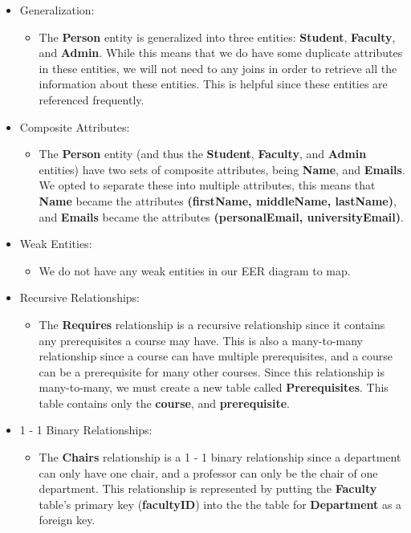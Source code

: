 \documentclass{report}
\begin{document}
\begin{itemize}

    \item Generalization:
    \begin{itemize}
        \item The \textbf{Person} entity is generalized into three entities: \textbf{Student}, \textbf{Faculty}, and \textbf{Admin}. While this means that we do have some duplicate attributes in these entities, we will not need to any joins in order to retrieve all the information about these entities. This is helpful since these entities are referenced frequently.
    \end{itemize}

    \item Composite Attributes:
    \begin{itemize}
        \item The \textbf{Person} entity (and thus the \textbf{Student}, \textbf{Faculty}, and \textbf{Admin} entities) have two sets of composite attributes, being \textbf{Name}, and \textbf{Emails}. We opted to separate these into multiple attributes, this means that \textbf{Name} became the attributes \textbf{(firstName, middleName, lastName)}, and \textbf{Emails} became the attributes \textbf{(personalEmail, universityEmail)}.
    \end{itemize}

    \item Weak Entities:
    \begin{itemize}
        \item We do not have any weak entities in our EER diagram to map.
    \end{itemize}

    \item Recursive Relationships:
    \begin{itemize}
        \item The \textbf{Requires} relationship is a recursive relationship since it contains any prerequisites a course may have. This is also a many-to-many relationship since a course can have multiple prerequisites, and a course can be a prerequisite for many other courses. Since this relationship is many-to-many, we must create a new table called \textbf{Prerequisites}. This table contains only the \textbf{course}, and \textbf{prerequisite}.
    \end{itemize}

    \item 1 - 1 Binary Relationships:
    \begin{itemize}
        \item The \textbf{Chairs} relationship is a 1 - 1 binary relationship since a department can only have one chair, and a professor can only be the chair of one department. This relationship is represented by putting the \textbf{Faculty} table's primary key (\textbf{facultyID}) into the the table for \textbf{Department} as a foreign key.
    \end{itemize}


\end{itemize}
\end{document}
